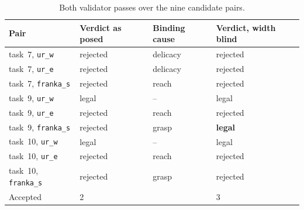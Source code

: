 \begin{table}[H]
\centering
\caption{Both validator passes over the nine candidate pairs.}
\label{tab:appendix:widthblind}
\begin{tabular}{llll}
\toprule
Pair & Verdict as posed & Binding cause & Verdict, width blind \\
\midrule
task~\num{7}, \texttt{ur\_w} & rejected & delicacy & rejected \\
task~\num{7}, \texttt{ur\_e} & rejected & delicacy & rejected \\
task~\num{7}, \texttt{franka\_s} & rejected & reach & rejected \\
task~\num{9}, \texttt{ur\_w} & legal & {--} & legal \\
task~\num{9}, \texttt{ur\_e} & rejected & reach & rejected \\
task~\num{9}, \texttt{franka\_s} & rejected & grasp & \textbf{legal} \\
task~\num{10}, \texttt{ur\_w} & legal & {--} & legal \\
task~\num{10}, \texttt{ur\_e} & rejected & reach & rejected \\
task~\num{10}, \texttt{franka\_s} & rejected & grasp & rejected \\
\midrule
Accepted & 2 & & 3 \\
\bottomrule
\end{tabular}
\end{table}

